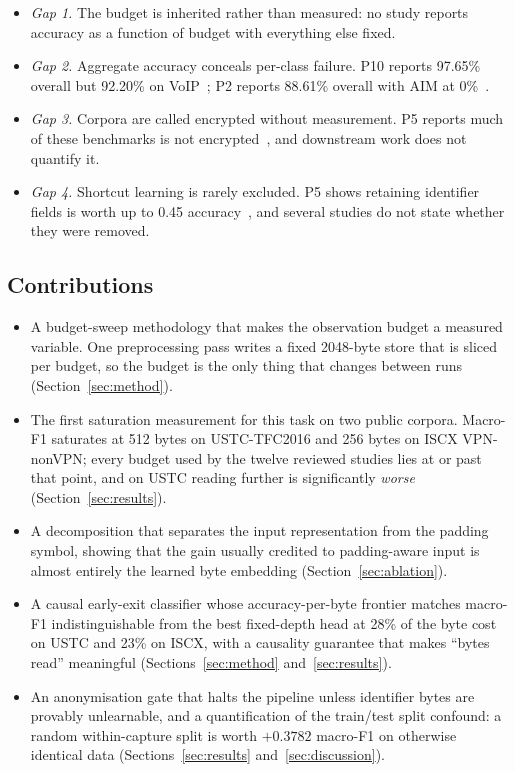 \documentclass[pdflatex,sn-mathphys-num]{sn-jnl}
\theoremstyle{thmstyleone}%
\theoremstyle{thmstylethree}%
\begin{document}
\begin{itemize}
\item \emph{Gap 1.} The budget is inherited rather than measured: no study
reports accuracy as a function of budget with everything else fixed.
\item \emph{Gap 2.} Aggregate accuracy conceals per-class failure. P10
reports 97.65\% overall but 92.20\% on VoIP~\cite{p10}; P2 reports 88.61\%
overall with AIM at 0\%~\cite{p2}.
\item \emph{Gap 3.} Corpora are called encrypted without measurement. P5
reports much of these benchmarks is not encrypted~\cite{p5}, and downstream
work does not quantify it.
\item \emph{Gap 4.} Shortcut learning is rarely excluded. P5 shows retaining
identifier fields is worth up to 0.45 accuracy~\cite{p5}, and several studies
do not state whether they were removed.
\end{itemize}

\subsection*{Contributions}

\begin{itemize}
\item A budget-sweep methodology that makes the observation budget a measured
variable. One preprocessing pass writes a fixed 2048-byte store that is sliced
per budget, so the budget is the only thing that changes between runs
(Section~\ref{sec:method}).
\item The first saturation measurement for this task on two public corpora.
Macro-F1 saturates at 512 bytes on USTC-TFC2016 and 256 bytes on ISCX
VPN-nonVPN; every budget used by the twelve reviewed studies lies at or past
that point, and on USTC reading further is significantly \emph{worse}
(Section~\ref{sec:results}).
\item A decomposition that separates the input representation from the padding
symbol, showing that the gain usually credited to padding-aware input is
almost entirely the learned byte embedding (Section~\ref{sec:ablation}).
\item A causal early-exit classifier whose accuracy-per-byte frontier matches
macro-F1 indistinguishable from the best fixed-depth head at 28\% of the byte
cost on USTC and 23\% on ISCX,
with a causality guarantee that makes ``bytes read'' meaningful
(Sections~\ref{sec:method} and~\ref{sec:results}).
\item An anonymisation gate that halts the pipeline unless identifier bytes are
provably unlearnable, and a quantification of the train/test split confound:
a random within-capture split is worth $+0.3782$ macro-F1 on otherwise
identical data (Sections~\ref{sec:results} and~\ref{sec:discussion}).
\end{itemize}
\end{document}
